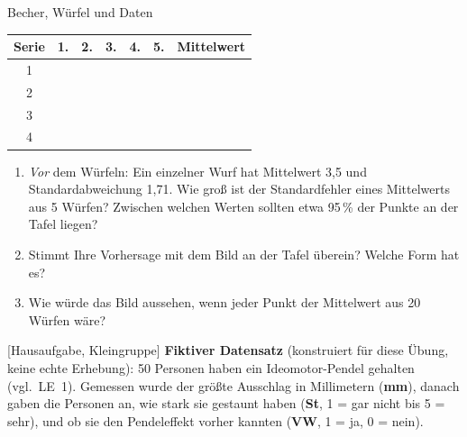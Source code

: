 \begin{uebungsblatt}{Becher, Würfel und Daten}
\begin{center}
\renewcommand{\arraystretch}{1.5}
\begin{tabular}{|c|c|c|c|c|c||c|}
\hline
\textbf{Serie} & \textbf{1.} & \textbf{2.} & \textbf{3.} & \textbf{4.} & \textbf{5.} & \textbf{Mittelwert} \\ \hline
1 & \hspace{8mm} & \hspace{8mm} & \hspace{8mm} & \hspace{8mm} & \hspace{8mm} & \hspace{18mm} \\ \hline
2 & & & & & & \\ \hline
3 & & & & & & \\ \hline
4 & & & & & & \\ \hline
\end{tabular}
\end{center}
\begin{enumerate}
  \item \emph{Vor} dem Würfeln: Ein einzelner Wurf hat Mittelwert 3,5 und
    Standardabweichung 1,71. Wie groß ist der Standardfehler eines
    Mittelwerts aus 5 Würfen? Zwischen welchen Werten sollten etwa 95\,\%
    der Punkte an der Tafel liegen?
  \item Stimmt Ihre Vorhersage mit dem Bild an der Tafel überein? Welche
    Form hat es?
  \item Wie würde das Bild aussehen, wenn jeder Punkt der Mittelwert aus
    20 Würfen wäre?
\end{enumerate}

[Hausaufgabe, Kleingruppe]
\textbf{Fiktiver Datensatz} (konstruiert für diese Übung, keine echte
Erhebung): 50 Personen haben ein Ideomotor-Pendel gehalten (vgl.\ LE~1).
Gemessen wurde der größte Ausschlag in Millimetern (\textbf{mm}), danach
gaben die Personen an, wie stark sie gestaunt haben (\textbf{St}, 1 = gar
nicht bis 5 = sehr), und ob sie den Pendeleffekt vorher kannten
(\textbf{VW}, 1 = ja, 0 = nein).


\end{uebungsblatt}
